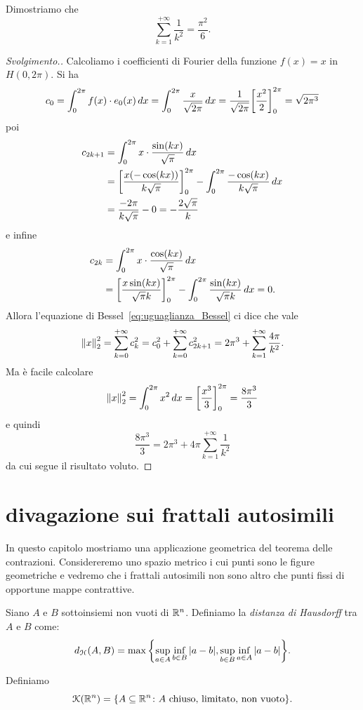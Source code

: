 \begin{exercise}
\label{ex:Basilea}%
Dimostriamo che
\begin{equation}\label{eq:basilea}
  \sum_{k=1}^{+\infty} \frac{1}{k^2} = \frac{\pi^2}{6}.
\end{equation}
\end{exercise}
\begin{proof}[Svolgimento.]
Calcoliamo i coefficienti di Fourier della funzione $f(x)=x$ in $H(0,2\pi)$.
Si ha
\[
 c_0 = \int_0^{2\pi} f(x)\cdot e_0(x)\, dx = \int_0^{2\pi} \frac{x}{\sqrt{2\pi}}\, dx = \frac{1}{\sqrt{2\pi}}{\left[ \frac{x^2}{2} \right]}_0^{2\pi}
  = \sqrt{2\pi^3}
\]
poi
\begin{align*}
  c_{2k+1} &= \int_0^{2\pi} x \cdot \frac{\sin(kx)}{\sqrt \pi}\, dx \\
   &= {\left[ \frac{x(-\cos(kx))}{k\sqrt \pi} \right]}_0^{2\pi}
   - \int_0^{2\pi} \frac{-\cos(kx)}{k\sqrt \pi}\, dx\\
   &= \frac{-2\pi}{k\sqrt \pi} - 0 = -\frac{2\sqrt \pi}{k}
\end{align*}
e infine
\begin{align*}
  c_{2k} &= \int_0^{2\pi} x \cdot \frac{\cos (kx)}{\sqrt \pi}\, dx \\
  &= {\left[ \frac{x \sin(kx)}{\sqrt \pi k} \right]}_0^{2\pi}
  - \int_0^{2\pi} \frac{\sin(kx)}{\sqrt \pi k}\, dx
  = 0.
\end{align*}
Allora l'equazione di Bessel~\eqref{eq:uguaglianza_Bessel} ci dice
che vale
\[
  {\left\Vert x\right\Vert}_2^2 = \sum_{k=0}^{+\infty} c_k^2
  = c_0^2 + \sum_{k=0}^{+\infty} c_{2k+1}^2
  = 2\pi^3 + \sum_{k=1}^{+\infty} \frac{4\pi}{k^2}.
\]
Ma è facile calcolare
\[
 {\left\Vert x\right\Vert}_2^2 = \int_0^{2\pi} x^2\, dx = {\left[ \frac{x^3}{3} \right]}_0^{2\pi}
  = \frac{8\pi^3}{3}
\]
e quindi
\[
  \frac{8\pi^3}{3} = 2\pi^3 + 4\pi \sum_{k=1}^{+\infty}\frac{1}{k^2}
\]
da cui segue il risultato voluto.
\end{proof}

\section{divagazione sui frattali autosimili}

In questo capitolo mostriamo una applicazione geometrica del teorema delle contrazioni.
Considereremo uno spazio metrico i cui punti sono le figure geometriche
e vedremo che i frattali autosimili non sono altro che punti fissi
di opportune mappe contrattive.

\begin{definition}
Siano $A$ e $B$ sottoinsiemi non vuoti di ${\mathbb R}^n$.
Definiamo la \emph{distanza di Hausdorff}
tra $A$ e $B$ come:
\[
  d_{\mathcal H}(A,B) = \max{\left\{ \sup_{a\in A}\inf_{b\in B} {\left|a-b\right|}, \sup_{b\in B} \inf_{a\in A} {\left|a-b\right|} \right\}}.
\]

Definiamo
\[
 \mathcal K({\mathbb R}^n) = {\left\{ A \subseteq {\mathbb R}^n \colon \text{$A$ chiuso, limitato, non vuoto} \right\}}.
\]
\end{definition}

